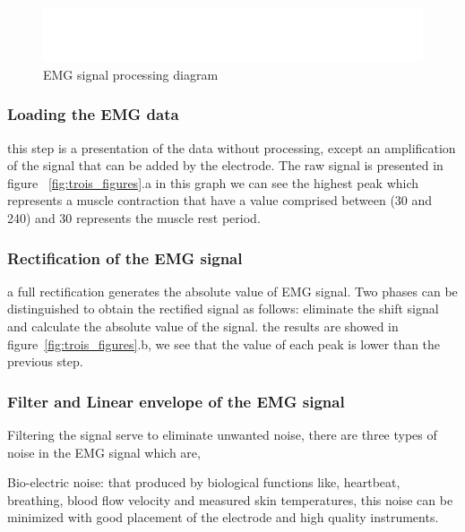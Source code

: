 \documentclass[conference]{IEEEtran}
\begin{document}
\begin{figure}[!hb]
    \includegraphics[scale=0.45]{Images/fig0.eps}
    \caption{EMG signal processing diagram}
    \label{fig:struct}
\end{figure}


\subsubsection{Loading the EMG data} \label{sub:LoadingtheEMGdata}\par
this step is a presentation of the data without processing, except an amplification of the signal that can be added by the electrode. The raw signal is presented in figure~ \ref{fig:trois_figures}.a in this graph we can see the highest peak which represents a muscle contraction that have a value comprised between (30 and 240) and 30 represents the muscle rest period.\par
\subsubsection{Rectification of the EMG signal} \label{sub:RectificationtheEMGsignal}\par
a full rectification generates the absolute value of EMG signal. Two phases can be distinguished to obtain the rectified signal as follows: eliminate the shift signal and calculate the absolute value of the signal. the results are showed in figure~\ref{fig:trois_figures}.b,
we see that the value of each peak is lower than the previous step.\par

\subsubsection{Filter and Linear envelope of the EMG signal } \label{sub:LinearenvelopeoftheEMGsignal}\par
Filtering the signal serve to eliminate unwanted noise, there are three types of noise in the EMG signal which are, \par
Bio-electric noise: that produced by biological functions like, heartbeat, breathing, blood flow velocity and measured skin temperatures, this noise can be minimized with good placement of the electrode and high quality instruments.\par
\end{document}
